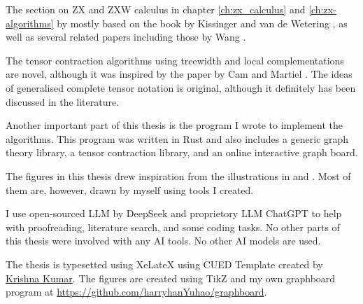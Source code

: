 The section on ZX and ZXW calculus in chapter \ref{ch:zx_calculus} and \ref{ch:zx-algorithms} by mostly based on the book by Kissinger and van de Wetering \cite{KissingerWetering2024Book}, as well as several related papers including those by Wang \cite{wang2025penrosetensordiagramszx, Wang_complete}.

The tensor contraction algorithms using treewidth and local complementations are novel, although it was inspired by the paper by Cam and Martiel \cite{cam2023speedingquantumcircuitssimulation}.
The ideas of generalised complete tensor notation is original, although it definitely has been discussed in the literature.

Another important part of this thesis is the program I wrote to implement the algorithms. 
This program was written in Rust and also includes a generic graph theory library, a tensor contraction library, and an online interactive graph board.

The figures in this thesis drew inspiration from the illustrations in \cite{KissingerWetering2024Book} and \cite{waintal2026competequantumcomputerslecture}. Most of them are, however, drawn by myself using tools I created.

I use open-sourced LLM by DeepSeek and proprietory LLM ChatGPT to help with proofreading, literature search, and some coding tasks.
No other parts of this thesis were involved with any AI tools. 
No other AI models are used.

The thesis is typesetted using XeLateX using CUED Template created by \href{https://github.com/kks32/phd-thesis-template} {Krishna Kumar}. 
The figures are created using TikZ and my own graphboard program at \url{https://github.com/harryhanYuhao/graphboard}.
